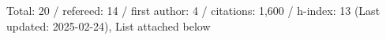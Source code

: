 Total: 20 / refereed: 14 / first author: 4 / citations: 1,600 / h-index: 13 (Last updated: 2025-02-24), List attached below